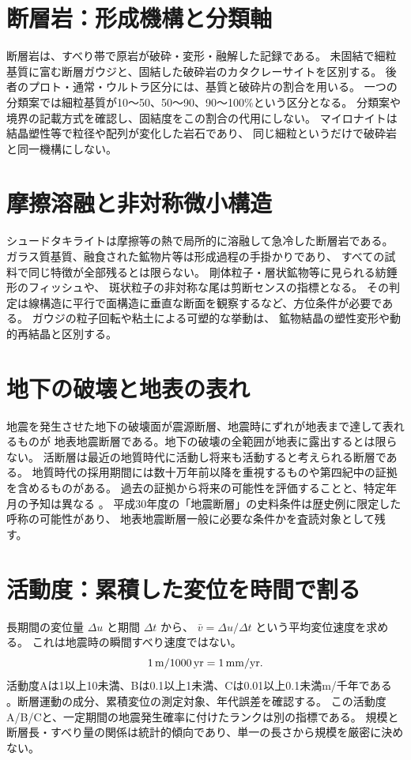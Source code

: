 \section{断層岩：形成機構と分類軸}
\label{theory:structure:rocks}
断層岩は、すべり帯で原岩が破砕・変形・融解した記録である。
未固結で細粒基質に富む断層ガウジと、固結した破砕岩のカタクレーサイトを区別する。
後者のプロト・通常・ウルトラ区分には、基質と破砕片の割合を用いる。
一つの分類案では細粒基質が10〜50、50〜90、90〜100\%という区分となる。
分類案や境界の記載方式を確認し、固結度をこの割合の代用にしない。
マイロナイトは結晶塑性等で粒径や配列が変化した岩石であり、
同じ細粒というだけで破砕岩と同一機構にしない\cite{str_faultrocks}。

\section{摩擦溶融と非対称微小構造}
\label{theory:structure:shear}
シュードタキライトは摩擦等の熱で局所的に溶融して急冷した断層岩である。
ガラス質基質、融食された鉱物片等は形成過程の手掛かりであり、
すべての試料で同じ特徴が全部残るとは限らない。
剛体粒子・層状鉱物等に見られる紡錘形のフィッシュや、
斑状粒子の非対称な尾は剪断センスの指標となる。
その判定は線構造に平行で面構造に垂直な断面を観察するなど、方位条件が必要である。
ガウジの粒子回転や粘土による可塑的な挙動は、
鉱物結晶の塑性変形や動的再結晶と区別する\cite{str_shear}。

\section{地下の破壊と地表の表れ}
\label{theory:structure:source}
地震を発生させた地下の破壊面が震源断層、地震時にずれが地表まで達して表れるものが
地表地震断層である。地下の破壊の全範囲が地表に露出するとは限らない。
活断層は最近の地質時代に活動し将来も活動すると考えられる断層である。
地質時代の採用期間には数十万年前以降を重視するものや第四紀中の証拠を含めるものがある。
過去の証拠から将来の可能性を評価することと、特定年月の予知は異なる
\cite{str_source}。
平成30年度の「地震断層」の史料条件は歴史例に限定した呼称の可能性があり、
地表地震断層一般に必要な条件かを査読対象として残す。

\section{活動度：累積した変位を時間で割る}
\label{theory:structure:activity}
長期間の変位量 \(\Delta u\) と期間 \(\Delta t\) から、
\(\bar v=\Delta u/\Delta t\) という平均変位速度を求める。
これは地震時の瞬間すべり速度ではない。
\[
1\,{\rm m}/1000\,{\rm yr}=1\,{\rm mm}/{\rm yr}.
\]
活動度Aは1以上10未満、Bは0.1以上1未満、Cは0.01以上0.1未満m/千年である
\cite{str_activity}。断層運動の成分、累積変位の測定対象、年代誤差を確認する。
この活動度A/B/Cと、一定期間の地震発生確率に付けたランクは別の指標である。
規模と断層長・すべり量の関係は統計的傾向であり、単一の長さから規模を厳密に決めない。

